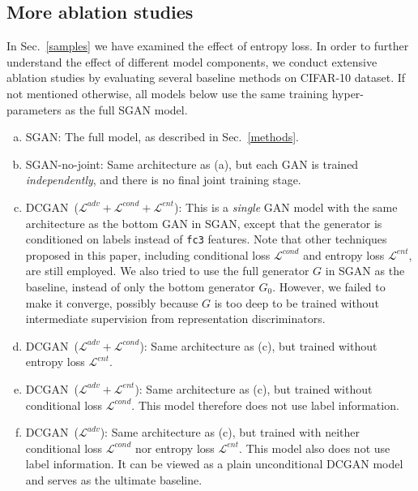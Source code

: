 \documentclass[10pt,twocolumn,letterpaper]{article}
\begin{document}
\subsection{More ablation studies}
In Sec.~\ref{samples} we have examined the effect of entropy loss. In order to further understand the effect of different model components, we conduct extensive ablation studies by evaluating several baseline methods on CIFAR-10 dataset. If not mentioned otherwise, all models below use the same training hyper-parameters as the full SGAN model.
\begin{enumerate}[(a)]
\item SGAN: The full model, as described in Sec.~\ref{methods}.
\item SGAN-no-joint: Same architecture as (a), but each GAN is trained \emph{independently}, and there is no final joint training stage. %
\item DCGAN~($\mathcal{L}^{adv}+\mathcal{L}^{cond}+\mathcal{L}^{ent}$): This is a \emph{single} GAN model with the same architecture as the bottom GAN in SGAN, except that the generator is conditioned on labels instead of \texttt{fc3} features. Note that other techniques proposed in this paper, including conditional loss $\mathcal{L}^{cond}$ and entropy loss $\mathcal{L}^{ent}$, are still employed. We also tried to use the full generator $G$ in SGAN as the baseline, instead of only the bottom generator $G_{0}$. However, we failed to make it converge, possibly because $G$ is too deep to be trained without intermediate supervision from representation discriminators.
\item DCGAN~($\mathcal{L}^{adv}+\mathcal{L}^{cond}$): Same architecture as (c), but trained without entropy loss $\mathcal{L}^{ent}$.
\item DCGAN~($\mathcal{L}^{adv}+\mathcal{L}^{ent}$): Same architecture as (c), but trained without conditional loss $\mathcal{L}^{cond}$. This model therefore does not use label information.
\item DCGAN~($\mathcal{L}^{adv}$): Same architecture as (c), but trained with neither conditional loss $\mathcal{L}^{cond}$ nor entropy loss $\mathcal{L}^{ent}$. This model also does not use label information. It can be viewed as a plain unconditional DCGAN model~\cite{radford2016unsupervised} and serves as the ultimate baseline.
\end{enumerate}
\end{document}
